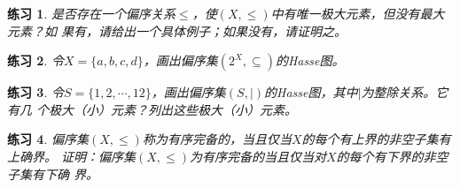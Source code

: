 \documentclass{book}[oneside]
\newtheorem{Exercise}{练习}[chapter]
\begin{document}
\begin{CJK*}{UTF8}{gbsn}
  \begin{Exercise}
    是否存在一个偏序关系$\leq$，使$(X,\leq)$中有唯一极大元素，但没有最大元素？如
    果有，请给出一个具体例子；如果没有，请证明之。
  \end{Exercise}
  \begin{Exercise}
    令$X=\{a,b,c,d\}$，画出偏序集$(2^X,\subseteq)$的Hasse图。
  \end{Exercise}
 \begin{Exercise}
 令$S=\{1,2,\cdots,12\}$，画出偏序集$(S,|)$的Hasse图，其中$|$为整除关系。它有几
 个极大（小）元素？列出这些极大（小）元素。
  \end{Exercise}
  \begin{Exercise}
    偏序集$(X,\leq)$称为有序完备的，当且仅当$X$的每个有上界的非空子集有上确界。
    证明：偏序集$(X,\leq)$为有序完备的当且仅当对$X$的每个有下界的非空子集有下确
    界。
  \end{Exercise}


      \chapter{}

\end{CJK*}
\end{document}
